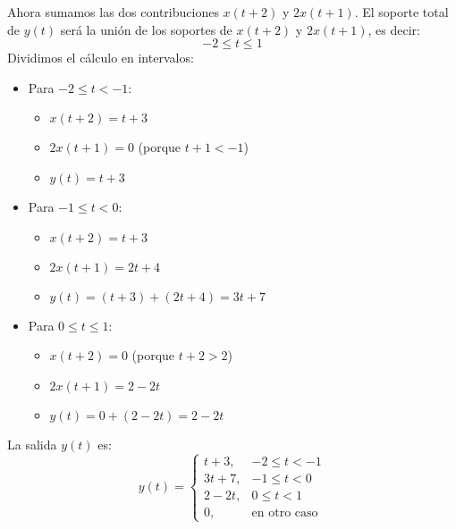 \begin{enumerate}[label=\color{red}\textbf{\arabic*)}]
\begin{enumerate}[label=Paso \arabic*:]
    Ahora sumamos las dos contribuciones  $x(t+2)$ y  $2x(t+1)$. El soporte total de $y(t)$ será la unión de los soportes de  $x(t+2)$ y  $2x(t+1)$, es decir:  \[
    -2\le t\le 1
    \] 
    Dividimos el cálculo en intervalos:
    \begin{itemize}[label=\textbullet]
      \item Para $-2\le t<-1$:
        \begin{itemize}[label=\textbullet]
          \item $x(t+2)=t+3$
          \item  $2x(t+1)=0$ (porque $t+1<-1$) 
          \item $y(t)=t+3$
        \end{itemize}
      \item Para $-1\le t<0$:
        \begin{itemize}[label=\textbullet]
          \item $x(t+2)=t+3$
          \item  $2x(t+1)=2t+4$
          \item  $y(t)=(t+3)+(2t+4)=3t+7$
        \end{itemize}
      \item Para $0\le t\le 1$:
        \begin{itemize}[label=\textbullet]
          \item $x(t+2)=0$ (porque $t+2>2$) 
          \item $2x(t+1)=2-2t$
          \item  $y(t)=0+(2-2t)=2-2t$
        \end{itemize}
    \end{itemize}
\end{enumerate}
    La salida $y(t)$ es:  \[
    y(t)=\begin{cases}
      t+3, & -2\le t<-1\\
      3t+7, & -1\le t<0\\
      2-2t, & 0\le t<1\\
      0, & \text{en otro caso}
    \end{cases}
    \]
    \begin{center}
\end{center}
\end{enumerate}
